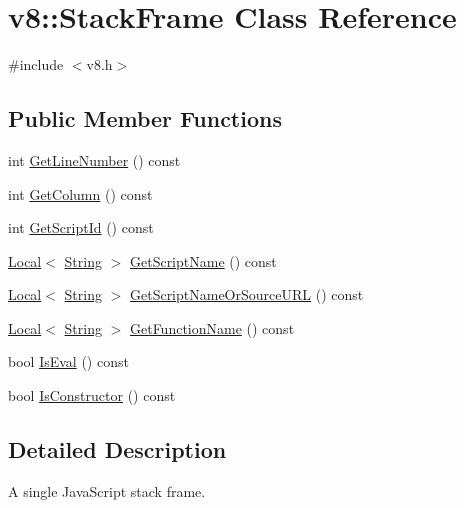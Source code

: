 \hypertarget{classv8_1_1StackFrame}{\section{v8\-:\-:Stack\-Frame Class Reference}
\label{classv8_1_1StackFrame}
}


{\ttfamily \#include $<$v8.\-h$>$}

\subsection*{Public Member Functions}
\begin{DoxyCompactItemize}
\item 
int \hyperlink{classv8_1_1StackFrame_a57886e590ac1a4c57ee6f6bf1009b5b1}{Get\-Line\-Number} () const 
\item 
int \hyperlink{classv8_1_1StackFrame_a44eccfb1bf17221ab6f69e977f3aa3a2}{Get\-Column} () const 
\item 
int \hyperlink{classv8_1_1StackFrame_ac449d55656f8b7638de3cf5f5530cb7a}{Get\-Script\-Id} () const 
\item 
\hyperlink{classv8_1_1Local}{Local}$<$ \hyperlink{classv8_1_1String}{String} $>$ \hyperlink{classv8_1_1StackFrame_ac9701a5687dd04bcf24fd02f62bbe1a8}{Get\-Script\-Name} () const 
\item 
\hyperlink{classv8_1_1Local}{Local}$<$ \hyperlink{classv8_1_1String}{String} $>$ \hyperlink{classv8_1_1StackFrame_ac9f436f4cb245d871fe7efce03edc0cc}{Get\-Script\-Name\-Or\-Source\-U\-R\-L} () const 
\item 
\hyperlink{classv8_1_1Local}{Local}$<$ \hyperlink{classv8_1_1String}{String} $>$ \hyperlink{classv8_1_1StackFrame_ac13cdea4b4253d82485e673de6264073}{Get\-Function\-Name} () const 
\item 
bool \hyperlink{classv8_1_1StackFrame_ae45f4d6ff9398a00a0b6534c160ec0c7}{Is\-Eval} () const 
\item 
bool \hyperlink{classv8_1_1StackFrame_ade01313f4a3f6b88691d9d544737f65c}{Is\-Constructor} () const 
\end{DoxyCompactItemize}


\subsection{Detailed Description}
A single Java\-Script stack frame. 

